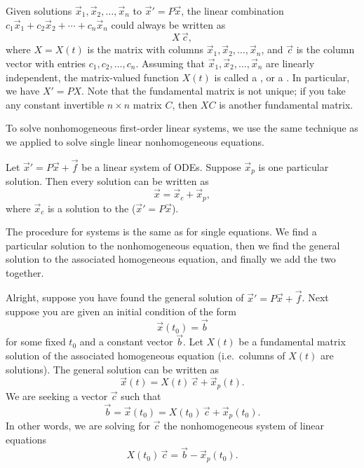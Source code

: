 Given solutions $\vec{x}_1,\vec{x}_2,\ldots,\vec{x}_n$
to $\vec{x}'=P\vec{x}$,
the linear combination $c_1 \vec{x}_1 + c_2 \vec{x}_2 + \cdots + c_n
\vec{x}_n$ could always be written as
\begin{equation*}
X\,\vec{c} ,
\end{equation*}
where $X=X(t)$ is the matrix with columns $\vec{x}_1, \vec{x}_2, \ldots, \vec{x}_n$,
and $\vec{c}$ is the column vector with entries $c_1, c_2, \ldots, c_n$.
Assuming that $\vec{x}_1,\vec{x}_2,\ldots,\vec{x}_n$ are linearly
independent,
the matrix-valued function $X(t)$ is called a \emph{},
or a \emph{}.
In particular, we have $X' = PX$.
Note that the fundamental matrix is not unique; if you take any constant
invertible $n\times n$ matrix $C$, then $X C$ is another fundamental matrix.

\medskip

To solve nonhomogeneous first-order linear systems, we use the same
technique as we applied to solve single linear nonhomogeneous equations.

\begin{theorem}
Let
${\vec{x}}' = P\vec{x} + \vec{f}$ be a linear system of ODEs.
Suppose $\vec{x}_p$ is one particular solution.  Then every solution
can be written as
\begin{equation*}
\vec{x} = \vec{x}_c + \vec{x}_p ,
\end{equation*}
where $\vec{x}_c$ is a solution to the
(${\vec{x}}' = P\vec{x}$).
\end{theorem}

The procedure for systems is the same as for single equations.
We find a particular solution
to the nonhomogeneous equation, then we find the general solution to the
associated homogeneous equation, and finally we add the two together.

\medskip

Alright, suppose you have found the general solution of
${\vec{x}}' = P\vec{x} + \vec{f}$.  Next suppose you are given an
initial condition of the form
\begin{equation*}
\vec{x}(t_0) = \vec{b}
\end{equation*}
for some fixed $t_0$ and a constant
vector $\vec{b}$.  Let $X(t)$ be a fundamental matrix solution
of the associated homogeneous equation
(i.e.\ columns of $X(t)$ are solutions).  The general solution can be
written as
\begin{equation*}
\vec{x}(t) = X(t)\,\vec{c} + \vec{x}_p(t).
\end{equation*}
We are seeking a vector 
$\vec{c}$ such that
\begin{equation*}
\vec{b} = \vec{x}(t_0) = X(t_0)\,\vec{c} + \vec{x}_p(t_0).
\end{equation*}
In other words, we are solving for $\vec{c}$ the nonhomogeneous system of linear equations
\begin{equation*}
X(t_0)\,\vec{c} = \vec{b} - \vec{x}_p(t_0) .
\end{equation*}

